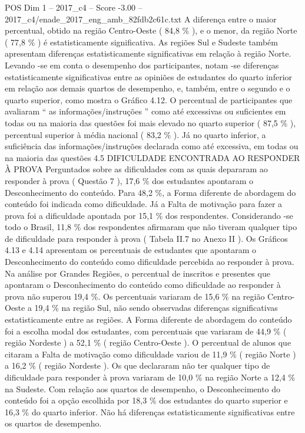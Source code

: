 \begin{textsample}{POS Dim 1 – 2017\_c4 – Score -3.00 – 2017\_c4/enade\_2017\_eng\_amb\_82fdb2c61c.txt}
A diferença entre o maior percentual, obtido na região Centro-Oeste ( 84,8 \% ), e o menor, da região Norte ( 77,8 \% ) é estatisticamente significativa.
As regiões Sul e Sudeste também apresentam diferenças estatisticamente significativas em relação à região Norte.
Levando -se em conta o desempenho dos participantes, notam -se diferenças estatisticamente significativas entre as opiniões de estudantes do quarto inferior em relação aos demais quartos de desempenho, e, também, entre o segundo e o quarto superior, como mostra o Gráfico 4.12.
O percentual de participantes que avaliaram “ as informações/instruções ” como até excessivas ou suficientes em todas ou na maioria das questões foi mais elevado no quarto superior ( 87,5 \% ), percentual superior à média nacional ( 83,2 \% ).
Já no quarto inferior, a suficiência das informações/instruções declarada como até excessiva, em todas ou na maioria das questões 4.5 DIFICULDADE ENCONTRADA AO RESPONDER À PROVA Perguntados sobre as dificuldades com as quais depararam ao responder à prova ( Questão 7 ), 17,6 \% dos estudantes apontaram o Desconhecimento do conteúdo.
Para 48,2 \%, a Forma diferente de abordagem do conteúdo foi indicada como dificuldade.
Já a Falta de motivação para fazer a prova foi a dificuldade apontada por 15,1 \% dos respondentes.
Considerando -se todo o Brasil, 11,8 \% dos respondentes afirmaram que não tiveram qualquer tipo de dificuldade para responder à prova ( Tabela II.7 no Anexo II ).
Os Gráficos 4.13 e 4.14 apresentam os percentuais de estudantes que apontaram o Desconhecimento do conteúdo como dificuldade percebida ao responder à prova.
Na análise por Grandes Regiões, o percentual de inscritos e presentes que apontaram o Desconhecimento do conteúdo como dificuldade ao responder à prova não superou 19,4 \%.
Os percentuais variaram de 15,6 \% na região Centro-Oeste a 19,4 \% na região Sul, não sendo observadas diferenças significativas estatisticamente entre as regiões.
A Forma diferente de abordagem do conteúdo foi a escolha modal dos estudantes, com percentuais que variaram de 44,9 \% ( região Nordeste ) a 52,1 \% ( região Centro-Oeste ).
O percentual de alunos que citaram a Falta de motivação como dificuldade variou de 11,9 \% ( região Norte ) a 16,2 \% ( região Nordeste ).
Os que declararam não ter qualquer tipo de dificuldade para responder à prova variaram de 10,0 \% na região Norte a 12,4 \% na Sudeste.
Com relação aos quartos de desempenho, o Desconhecimento do conteúdo foi a opção escolhida por 18,3 \% dos estudantes do quarto superior e 16,3 \% do quarto inferior.
Não há diferenças estatisticamente significativas entre os quartos de desempenho.

\end{textsample}
